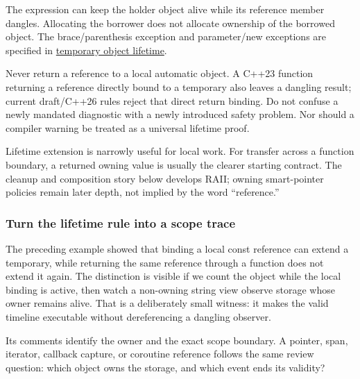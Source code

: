 The  expression can keep the holder object alive while its reference member dangles. Allocating the borrower does not allocate ownership of the borrowed object. The brace/parenthesis exception and parameter/new exceptions are specified in \href{https://eel.is/c++draft/class.temporary}{temporary object lifetime}.

Never return a reference to a local automatic object. A C++23 function returning a reference directly bound to a temporary also leaves a dangling result; current draft/C++26 rules reject that direct return binding. Do not confuse a newly mandated diagnostic with a newly introduced safety problem. Nor should a compiler warning be treated as a universal lifetime proof.

Lifetime extension is narrowly useful for local work. For transfer across a function boundary, a returned owning value is usually the clearer starting contract. The cleanup and composition story below develops RAII; owning smart-pointer policies remain later depth, not implied by the word ``reference.''

\subsubsection{Turn the lifetime rule into a scope trace}\label{01-foundations-i-ch003-turn-the-lifetime-rule-into-a-scope-trace}

\hypertarget{01-foundations-i-ch003-turn-the-lifetime-rule-into-a-scope-trace}{}

The preceding example showed that binding a local const reference can extend a temporary, while returning the same reference through a function does not extend it again. The distinction is visible if we count the object while the local binding is active, then watch a non-owning string view observe storage whose owner remains alive. That is a deliberately small witness: it makes the valid timeline executable without dereferencing a dangling observer.

Its comments identify the owner and the exact scope boundary. A pointer, span, iterator, callback capture, or coroutine reference follows the same review question: which object owns the storage, and which event ends its validity?

